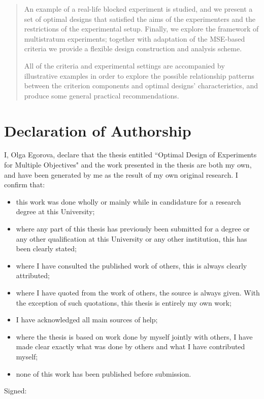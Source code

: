 \documentclass[titlepage,twoside,openright,final,11pt]{report}
\newcommand\blankpage{%
    \null
    \thispagestyle{empty}%
    \addtocounter{page}{-1}%
    \newpage}
\begin{document}
\begin{abstract}
An example of a real-life blocked experiment is studied, and we present a set of optimal designs that satisfied the aims of the experimenters and the restrictions of the experimental setup. Finally, we explore the framework of multistratum experiments; together with adaptation of the MSE-based criteria we provide a flexible design construction and analysis scheme.

All of the criteria and experimental settings are accompanied by illustrative examples in order to explore the possible relationship patterns between the criterion components and optimal designs' characteristics, and produce some general practical recommendations. 

 \afterpage{\blankpage}
 \end{abstract}


\tableofcontents

\cleardoublepage
{}
{}
\listoffigures

\cleardoublepage
{}
{}
\listoftables

\chapter*{Declaration of Authorship}

I, Olga Egorova, declare that the thesis entitled ``Optimal Design of Experiments for Multiple Objectives" and the work presented in the thesis are both my own, and have been generated by me as the result of my own original research. I confirm that:
\begin{itemize}
\item this work was done wholly or mainly while in candidature for a research degree at this University;
\item where any part of this thesis has previously been submitted for a degree or any other qualification at this University or any other institution, this has been clearly stated;
\item where I have consulted the published work of others, this is always clearly attributed;
\item where I have quoted from the work of others, the source is always given. With the
exception of such quotations, this thesis is entirely my own work;
\item  I have acknowledged all main sources of help;
\item where the thesis is based on work done by myself jointly with others, I have made clear exactly what was done by others and what I have contributed myself;
\item none of this work has been published before submission.
\end{itemize}
\vspace{1cm}
Signed: \\
\end{document}

